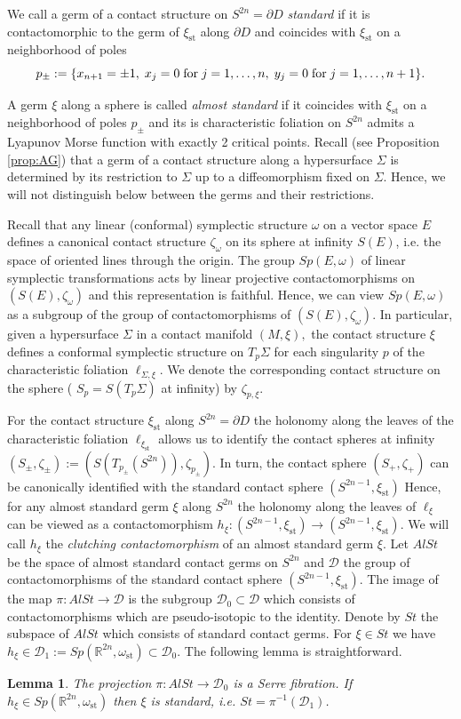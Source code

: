 \documentclass[12pt]{amsart}
\theoremstyle{plain}
\newtheorem{lemma}[theorem]{Lemma}
\theoremstyle{definition}
\theoremstyle{remark}
\newcommand{\R}{\mathbb{R}}
\newcommand{\D}{\mathcal{D}}
\newcommand{\p}{\partial}
\newcommand{\om}{\omega}
\newcommand{\st}{\mathrm{st}}
\begin{document}
We call a germ of a contact structure  on $S^{2n}=\p D$ {\em standard} if it is contactomorphic to the germ  of $\xi_\st$ along $\p D$ and coincides with $\xi_\st$ on a neighborhood of poles $$p_\pm:=\{x_{n+1}=\pm 1,\; x_j=0\;\hbox{for}\;j=1,\dots, n,\; y_j=0\;\hbox{for}\; j=1,\dots, n+1\}.$$
    
 
 
 
 A germ $\xi$ along a sphere is called  {\em almost standard} if it coincides with $\xi_\st$ on a neighborhood of poles $p_\pm$ and its is   characteristic foliation on $S^{2n}$   admits a Lyapunov  Morse function with  exactly 2 critical points.  Recall (see Proposition \ref{prop:AG}) that a germ of a contact structure along a hypersurface $\Sigma$ is determined  by its restriction to $\Sigma$  up to a diffeomorphism fixed on $\Sigma$. Hence, we will not distinguish below between the germs and their restrictions.
 
 Recall that any linear (conformal) symplectic structure $\om$ on a vector space $E$ defines a canonical contact structure $\zeta_\om$
  on its sphere at infinity $S(E)$, i.e. the space of oriented lines through the origin.  The group $Sp(E,\om)$ of linear symplectic transformations acts by linear projective contactomorphisms on $(S(E),\zeta_\om)$  and this representation is faithful. Hence, we can view  $Sp(E,\om)$ as a subgroup of the group of contactomorphisms of $(S(E),\zeta_\om)$.
 In particular, given a hypersurface $\Sigma$ in a contact manifold $(M,\xi),$  the contact structure $\xi$ defines a conformal symplectic structure on $T_p\Sigma$ for each singularity $p$ of the characteristic foliation $\ell_{\Sigma,\xi}$. We denote the corresponding contact structure on the sphere ( $S_p=S(T_p\Sigma)$ at infinity)  by $\zeta_{p,\xi}$.
 
 For the  contact structure $\xi_\st $ along $S^{2n}=\p D$ the holonomy along the leaves of the characteristic foliation $\ell_{\xi_\st}$ allows us to identify the contact spheres at infinity $(S_\pm,\zeta_\pm):=\left(S \left(T_{p_\pm}(S^{2n})\right),\zeta_{p_\pm}\right).$ In turn, the contact sphere $(S_+,\zeta_+)$ can be canonically identified with the  standard contact sphere $(S^{2n-1},\xi_\st)$
 Hence, for any almost standard germ $\xi$ along $S^{2n}$ the holonomy along the leaves
 of $\ell_\xi$ can be viewed as a contactomorphism $h_\xi:(S^{2n-1},\xi_\st)\to (S^{2n-1},\xi_\st)$. 
 We will call $h_\xi$ the {\em clutching contactomorphism} of an almost standard germ $\xi$.
 Let $AlSt$  be the space of almost standard contact germs on $S^{2n}$  and $\D$   the group of contactomorphisms  of  the standard contact sphere $(S^{2n-1},\xi_\st)$.  The image of the map $\pi: AlSt\to\D$ is the subgroup $\D_0\subset\D$ which consists of  contactomorphisms which are pseudo-isotopic  to the identity.  Denote by $St$ the subspace of $AlSt$ which consists of standard contact germs.  For  $\xi\in St$  we have $h_\xi\in \D_1:=Sp(\R^{2n},\om_\st)\subset \D_0$. 
  The following lemma is straightforward.
\begin{lemma}\label{lm:al-st-holonomy} The projection  $\pi:AlSt\to\D_0$  is a Serre fibration. If $h_\xi\in Sp(\R^{2n},\om_\st)$ then $\xi$ is standard, i.e. $St=\pi^{-1}(\D_1)$.  
\end{lemma}
   
\end{document}
